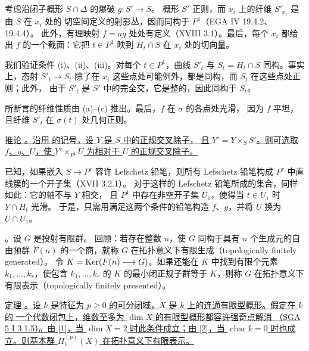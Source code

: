 考虑沿闭子概形 $S\cap\Delta$ 的爆破 $g:S'\longrightarrow S$。
概形 $S'$ 正则，而 $x_i$ 上的纤维 $S'_{x_i}$ 是由 $S$ 在 $x_i$ 处的
切空间定义的射影丛，因而同构于 $P^1$（EGA IV 19.4.2、19.4.4）。
此外，有理映射 $f=ag$ 处处有定义（XVIII 3.1）。最后，每个 $x_i$ 都给出
$f$ 的一个截面：它把 $t\in P^1$ 映到 $H_t\cap S$ 在 $x_i$ 处的切向量。

我们验证条件 (i)、(ii)、(iii)。对每个 $t\in P^1$，曲线 $S'_t$ 与
$S_t=H_t\cap S$ 同构。事实上，态射 $S'_t\longrightarrow S_t$ 除了在
$x_i$ 这些点处可能例外，都是同构，而 $S_t$ 在这些点处正则；此外，
由于 $S'_t$ 是 $S'$ 中的完全交，它是整的，因此同构于 $S_t$。

所断言的纤维性质由 (a)--(c) 推出。最后，$f$ 在 $\sigma$ 的各点处光滑，
因为 $f$ 平坦，且纤维 $S'_t$ 在 $\sigma(t)$ 处几何正则。


\underline{推论 。沿用
 的记号，设 $Y$ 是 $S$ 中的正规交叉除子，
且 $Y'=Y\times_S S'$。则可选取 $f$、$g$、$U$，使
$Y'\times_{P^1}U$ 为相对于 $U$ 的正规交叉除子。}

已知，如果嵌入 $S\longrightarrow P^r$ 容许 Lefschetz 铅笔，则所有
Lefschetz 铅笔构成 $P^r$ 中直线簇的一个开子集（XVII 3.2.1）。
对于这样的 Lefschetz 铅笔所成的集合，同样如此：它的轴不与 $Y$ 相交，
且 $P^1$ 中存在非空开子集 $U_1$，使得当 $t\in U_1$ 时 $Y\cap H_t$ 光滑。
于是，只需用满足这两个条件的铅笔构造 $f$、$g$，并将 $U$ 换为 $U\cap U_1$。

。设 $G$ 是投射有限群。
回顾：若存在整数 $n$，使 $G$ 同构于具有 $n$ 个生成元的自由预群 $F(n)$
的一个商，就称 $G$ 在拓扑意义下有限生成（topologically finitely generated）。
令 $K=\operatorname{Ker}(F(n)\longrightarrow G)$。如果还能在 $K$ 中找到有限个元素
$k_1,\ldots,k_r$，使包含 $k_1,\ldots,k_r$ 的 $K$ 的最小闭正规子群等于 $K$，则称
$G$ 在拓扑意义下有限表示（topologically finitely presented）。

\underline{定理 。设 $k$ 是特征为
$p\geq 0$ 的可分闭域，$X$ 是 $k$ 上的连通有限型概形。假定在 $k$ 的
一个代数闭包上，维数至多为 $\dim X$ 的有限型概形都容许强奇点解消
（SGA 5 I 3.1.5）。由 [1]，当 $\dim X=2$ 时此条件成立；由 [2]，当
$\operatorname{char}k=0$ 时也成立。则基本群 $\Pi_1^{(p)}(X)$ 在拓扑意义下有限表示。}

